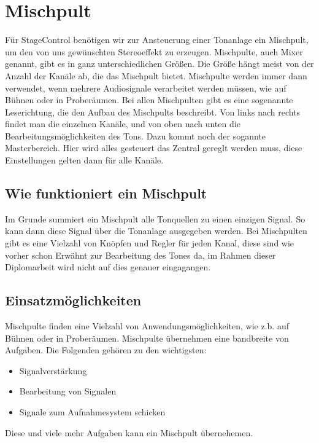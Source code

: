 \section{Mischpult}
 Für StageControl benötigen wir zur Ansteuerung einer Tonanlage ein Mischpult, um den von uns gewünschten Stereoeffekt zu erzeugen. Mischpulte, auch Mixer genannt, gibt es in ganz unterschiedlichen Größen. Die Größe hängt meist von der Anzahl der Kanäle ab, die das Mischpult bietet. Mischpulte werden immer dann verwendet, wenn mehrere Audiosignale verarbeitet werden müssen, wie auf Bühnen oder in Proberäumen. Bei allen Mischpulten gibt es eine sogenannte Leserichtung, die den Aufbau des Mischpults beschreibt. Von links nach rechts findet man die einzelnen Kanäle, und von oben nach unten die Bearbeitungsmöglichkeiten des Tons. Dazu kommt noch der sogannte Masterbereich. Hier wird alles gesteuert das Zentral gereglt werden muss, diese Einstellungen gelten dann für alle Kanäle. \\
\cite{Mischpult_Information}  \cite{Mischpult_Master}

\subsection{Wie funktioniert ein Mischpult}
Im Grunde summiert ein Mischpult alle Tonquellen zu einen einzigen Signal. So kann dann diese Signal über die Tonanlage ausgegeben werden. Bei Mischpulten gibt es eine Vielzahl von Knöpfen und Regler für jeden Kanal, diese sind wie vorher schon Erwähnt zur Bearbeitung des Tones da, im Rahmen dieser Diplomarbeit wird nicht auf dies genauer eingagangen. \\
\cite{Mischpult_Erklaerung}

\subsection{Einsatzmöglichkeiten}
Mischpulte finden eine Vielzahl von Anwendungsmöglichkeiten, wie z.b. auf Bühnen oder in Proberäumen. Mischpulte übernehmen eine bandbreite von Aufgaben. Die Folgenden gehören zu den wichtigsten:
\begin{itemize}
	\item Signalverstärkung
	\item Bearbeitung von Signalen
	\item Signale zum Aufnahmesystem schicken
\end{itemize}
Diese und viele mehr Aufgaben kann ein Mischpult übernehemen. \\
\cite{Mischpult_Verwendungszweck}

